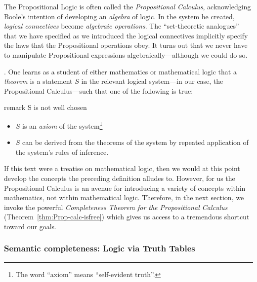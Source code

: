 
\medskip

The Propositional Logic is often called the {\it Propositional
  Calculus},  acknowledging Boole's
intention of developing an {\em algebra} of logic.  In the system he
created, {\em logical connectives} become {\em algebraic operations}.
The ``set-theoretic analogues'' that we have specified as we
introduced the logical connectives implicitly specify the laws that
the Propositional operations obey.  It turns out that we never have to
manipulate Propositional expressions algebraically---although we could
do so.

\bigskip

.
One learns as a student of either mathematics or mathematical logic
that a {\it theorem} is a statement $S$ in the relevant logical
system---in our case, the Propositional Calculus---such that one of
the following is true:

{\Denis remark S is not well chosen}
\begin{itemize}
\item
$S$ is an {\it axiom} of the system\footnote{The word ``axiom'' means ``self-evident truth''.}
\item
$S$ can be derived from the theorems of the system by repeated
  application of the system's rules of inference.
\end{itemize}
If this text were a treatise on mathematical logic, then we would at
this point develop the concepts the preceding definition alludes to.
However, for us the Propositional Calculus is an avenue for
introducing a variety of concepts within mathematics, not within
mathematical logic.  Therefore, in the next section, we invoke the
powerful {\it Completeness Theorem for the Propositional Calculus}
(Theorem~\ref{thm:Prop-calc-isfree}) which gives us access to a
tremendous shortcut toward our goals.


\subsubsection{Semantic completeness: Logic via Truth Tables}
\label{sec:truth-tables}

